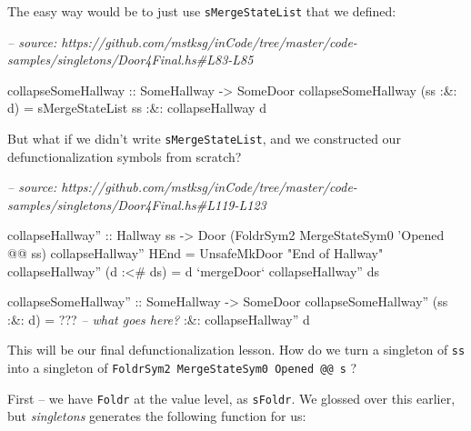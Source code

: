 \documentclass[]{article}
\newenvironment{Shaded}{}{}
\newcommand{\CommentTok}[1]{\textcolor[rgb]{0.38,0.63,0.69}{\textit{#1}}}
\newcommand{\DataTypeTok}[1]{\textcolor[rgb]{0.56,0.13,0.00}{#1}}
\newcommand{\FunctionTok}[1]{\textcolor[rgb]{0.02,0.16,0.49}{#1}}
\newcommand{\NormalTok}[1]{#1}
\newcommand{\OtherTok}[1]{\textcolor[rgb]{0.00,0.44,0.13}{#1}}
\newcommand{\StringTok}[1]{\textcolor[rgb]{0.25,0.44,0.63}{#1}}
\begin{document}
The easy way would be to just use \texttt{sMergeStateList} that we defined:

\begin{Shaded}
\begin{Highlighting}[]
\CommentTok{-- source: https://github.com/mstksg/inCode/tree/master/code-samples/singletons/Door4Final.hs#L83-L85}

\OtherTok{collapseSomeHallway ::} \DataTypeTok{SomeHallway} \OtherTok{->} \DataTypeTok{SomeDoor}
\NormalTok{collapseSomeHallway (ss }\FunctionTok{:&:}\NormalTok{ d) }\FunctionTok{=}\NormalTok{ sMergeStateList ss}
                             \FunctionTok{:&:}\NormalTok{ collapseHallway d}
\end{Highlighting}
\end{Shaded}

But what if we didn't write \texttt{sMergeStateList}, and we constructed our
defunctionalization symbols from scratch?

\begin{Shaded}
\begin{Highlighting}[]
\CommentTok{-- source: https://github.com/mstksg/inCode/tree/master/code-samples/singletons/Door4Final.hs#L119-L123}

\NormalTok{collapseHallway''}
\OtherTok{    ::} \DataTypeTok{Hallway}\NormalTok{ ss}
    \OtherTok{->} \DataTypeTok{Door}\NormalTok{ (}\DataTypeTok{FoldrSym2} \DataTypeTok{MergeStateSym0}\NormalTok{ '}\DataTypeTok{Opened} \FunctionTok{@@}\NormalTok{ ss)}
\NormalTok{collapseHallway'' }\DataTypeTok{HEnd}       \FunctionTok{=} \DataTypeTok{UnsafeMkDoor} \StringTok{"End of Hallway"}
\NormalTok{collapseHallway'' (d }\FunctionTok{:<#}\NormalTok{ ds) }\FunctionTok{=}\NormalTok{ d }\OtherTok{`mergeDoor`}\NormalTok{ collapseHallway'' ds}

\OtherTok{collapseSomeHallway'' ::} \DataTypeTok{SomeHallway} \OtherTok{->} \DataTypeTok{SomeDoor}
\NormalTok{collapseSomeHallway'' (ss }\FunctionTok{:&:}\NormalTok{ d) }\FunctionTok{=} \FunctionTok{???}    \CommentTok{-- what goes here?}
                               \FunctionTok{:&:}\NormalTok{ collapseHallway'' d}
\end{Highlighting}
\end{Shaded}

This will be our final defunctionalization lesson. How do we turn a singleton of
\texttt{ss} into a singleton of
\texttt{FoldrSym2\ MergeStateSym0\ \textquotesingle{}Opened\ @@\ s} ?

First -- we have \texttt{Foldr} at the value level, as \texttt{sFoldr}. We
glossed over this earlier, but \emph{singletons} generates the following
function for us:
\end{document}
